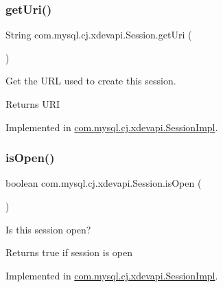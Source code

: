 \subsubsection{\texorpdfstring{get\+Uri()}{getUri()}}
{\footnotesize\ttfamily String com.\+mysql.\+cj.\+xdevapi.\+Session.\+get\+Uri (\begin{DoxyParamCaption}{ }\end{DoxyParamCaption})}

Get the U\+RL used to create this session.

\begin{DoxyReturn}{Returns}
U\+RI 
\end{DoxyReturn}


Implemented in \mbox{\hyperlink{classcom_1_1mysql_1_1cj_1_1xdevapi_1_1_session_impl_af181caf1c47641912a47ef9445a9ddca}{com.\+mysql.\+cj.\+xdevapi.\+Session\+Impl}}.

\mbox{\label{interfacecom_1_1mysql_1_1cj_1_1xdevapi_1_1_session_a8054b47c7bdc370ab26b41ec9ba527a6}} 
\subsubsection{\texorpdfstring{is\+Open()}{isOpen()}}
{\footnotesize\ttfamily boolean com.\+mysql.\+cj.\+xdevapi.\+Session.\+is\+Open (\begin{DoxyParamCaption}{ }\end{DoxyParamCaption})}

Is this session open?

\begin{DoxyReturn}{Returns}
true if session is open 
\end{DoxyReturn}


Implemented in \mbox{\hyperlink{classcom_1_1mysql_1_1cj_1_1xdevapi_1_1_session_impl_a0b6cff692d4e7882a546118b25820978}{com.\+mysql.\+cj.\+xdevapi.\+Session\+Impl}}.

\mbox{\label{interfacecom_1_1mysql_1_1cj_1_1xdevapi_1_1_session_ad372434e6431ce9a396a29d03f3ad8c4}} 
